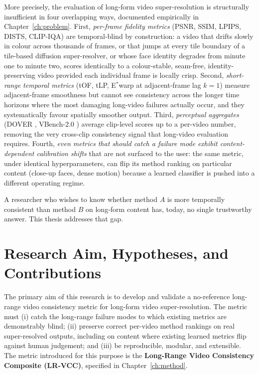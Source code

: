 More precisely, the evaluation of long-form video super-resolution is structurally
insufficient in four overlapping ways, documented empirically in
Chapter~\ref{ch:problem}. First, \emph{per-frame fidelity metrics} (PSNR, SSIM, LPIPS,
DISTS, CLIP-IQA) are temporal-blind by construction: a video that drifts slowly in colour
across thousands of frames, or that jumps at every tile boundary of a tile-based diffusion
super-resolver, or whose face identity degrades from minute one to minute two, scores
identically to a colour-stable, seam-free, identity-preserving video provided each
individual frame is locally crisp. Second, \emph{short-range temporal metrics} (tOF, tLP,
E$^*$warp at adjacent-frame lag $k{=}1$) measure adjacent-frame smoothness but cannot see
consistency across the longer time horizons where the most damaging long-video failures
actually occur, and they systematically favour spatially smoother output. Third,
\emph{perceptual aggregates} (DOVER \cite{wu_dover_2023}, VBench-2.0
\cite{huang_vbench2_2025}) average clip-level scores up to a per-video number, removing
the very cross-clip consistency signal that long-video evaluation requires. Fourth,
\emph{even metrics that should catch a failure mode exhibit content-dependent calibration
shifts} that are not surfaced to the user: the same metric, under identical
hyperparameters, can flip its method ranking on particular content (close-up faces, dense
motion) because a learned classifier is pushed into a different operating regime.

A researcher who wishes to know whether method $A$ is more temporally consistent than
method $B$ on long-form content has, today, no single trustworthy answer. This thesis
addresses that gap.

\section{Research Aim, Hypotheses, and Contributions}
\label{sec:intro:aim}

The primary aim of this research is to develop and validate a no-reference long-range
video consistency metric for long-form video super-resolution. The metric must (i) catch
the long-range failure modes to which existing metrics are demonstrably blind; (ii)
preserve correct per-video method rankings on real super-resolved outputs, including on
content where existing learned metrics flip against human judgement; and (iii) be
reproducible, modular, and extensible. The metric introduced for this purpose is the
\textbf{Long-Range Video Consistency Composite (LR-VCC)}, specified in
Chapter~\ref{ch:method}.

